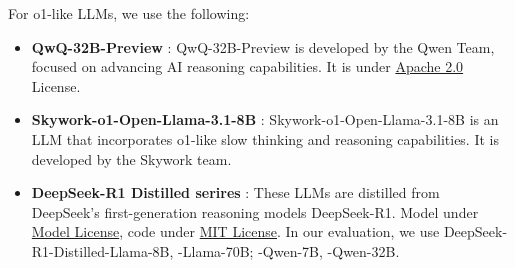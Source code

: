 For o1-like LLMs, we use the following:

\begin{itemize}
    \item \textbf{QwQ-32B-Preview} \citep{qwq32b_blog}: QwQ-32B-Preview is developed by the Qwen Team, focused on advancing AI reasoning capabilities. It is under \href{https://www.apache.org/licenses/LICENSE-2.0}{Apache 2.0} License.
    \item \textbf{Skywork-o1-Open-Llama-3.1-8B} \citep{skyworkmodelcard}: Skywork-o1-Open-Llama-3.1-8B is an LLM that incorporates o1-like slow thinking and reasoning capabilities. It is developed by the Skywork team.
    \item \textbf{DeepSeek-R1 Distilled serires} \citep{deepseekr12025deepseekai}:
    These LLMs are distilled from DeepSeek's first-generation reasoning models DeepSeek-R1. Model under \href{https://github.com/deepseek-ai/DeepSeek-R1/blob/main/LICENSE-MODEL}{Model License}, code under \href{https://github.com/deepseek-ai/DeepSeek-R1/blob/main/LICENSE-CODE}{MIT License}. In our evaluation, we use DeepSeek-R1-Distilled-Llama-8B, -Llama-70B; -Qwen-7B, -Qwen-32B.
\end{itemize}



